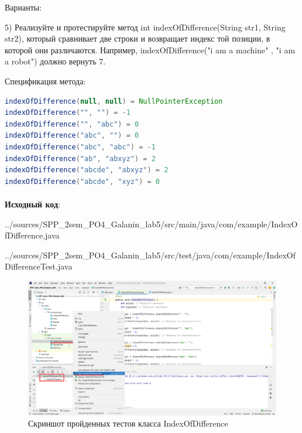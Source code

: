\documentclass[12pt, a4paper, simple]{eskdtext}
\begin{document}
    Варианты:

    5) Реализуйте и протестируйте метод int indexOfDifference(String str1, String str2),
    который сравнивает две строки и возвращает индекс той позиции,
    в которой они различаются.
    Например, indexOfDifference("i am a machine" , "i am a robot") должно вернуть 7.

    Спецификация метода:

    \begin{lstlisting}[language=java, name=Пример кода для задания 2 (вариант 5)]
indexOfDifference(null, null) = NullPointerException
indexOfDifference("", "") = -1
indexOfDifference("", "abc") = 0
indexOfDifference("abc", "") = 0
indexOfDifference("abc", "abc") = -1
indexOfDifference("ab", "abxyz") = 2
indexOfDifference("abcde", "abxyz") = 2
indexOfDifference("abcde", "xyz") = 0
\end{lstlisting}
    
    \paragraph{} \textbf{Исходный код}: 

    
    {../sources/SPP_2sem_PO4_Galanin_lab5/src/main/java/com/example/IndexOfDifference.java}

    
    {../sources/SPP_2sem_PO4_Galanin_lab5/src/test/java/com/example/IndexOfDifferenceTest.java}

    \begin{figure}[!h]
        \centering
        \includegraphics[width=16cm]
            {_assets/IndexOfDifferenceTest.png}
        \caption{Скриншот пройденных тестов класса IndexOfDifference}
    \end{figure}
\end{document}
